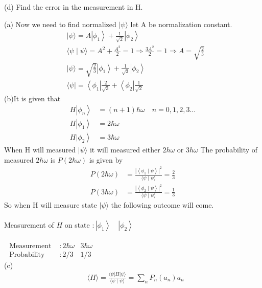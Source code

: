 \begin{enumerate}
	(d) Find the error in the measurement in $\mathrm{H}$.
\begin{answer}
(a)	Now we need to find normalized $|\psi\rangle$ let A be normalization constant.\\
	\begin{align*}
	&|\psi\rangle=A\left|\phi_{1}\right\rangle+\frac{1}{\sqrt{2}}\left|\phi_{2}\right\rangle \\
	&\langle\psi \mid \psi\rangle=A^{2}+\frac{A^{2}}{2}=1 \Rightarrow \frac{3 A^{2}}{2}=1 \Rightarrow A=\sqrt{\frac{2}{3}}\\
		&|\psi\rangle=\sqrt{\frac{2}{3}}\left|\phi_{1}\right\rangle+\frac{1}{\sqrt{3}}\left|\phi_{2}\right\rangle \\
		&\langle\psi|=\left\langle\phi_{1}\right| \frac{2}{\sqrt{3}}+\left\langle\phi_{2}\right| \frac{1}{\sqrt{2}}
	\end{align*}
	(b)It is given that
	\begin{align*}
	H\left|\phi_{n}\right\rangle&=(n+1) \hbar \omega \quad n=0,1,2,3 \ldots\\
		H\left|\phi_{1}\right\rangle&=2 \hbar \omega\\
			\left.H| \phi_{2}\right\rangle&=3 \hbar \omega	
	\end{align*}
	When $\mathrm{H}$ will measured $|\psi\rangle$ it will measured either $2 h \omega$ or $3 h \omega$ The probability of measured $2 \hbar \omega$ is $P(2 \hbar \omega)$ is given by
	\begin{align*}
	P(2 \hbar \omega)&=\frac{\left|\left\langle\phi_{1} \mid \psi\right\rangle\right|^{2}}{\langle\psi \mid \psi\rangle}=\frac{2}{3}\\
	P(3 \hbar \omega)&=\frac{\left|\left\langle\phi_{2} \mid \psi\right\rangle\right|^{2}}{\langle\psi \mid \psi\rangle}=\frac{1}{3}
	\end{align*}
	So when $\mathrm{H}$ will measure state $|\psi\rangle$ the following outcome will come.\\\\
	Measurement of $H$ on state $:\left|\phi_{1}\right\rangle \quad\left|\phi_{2}\right\rangle$\\\\
	$\begin{array}{lll}
		\text { Measurement } & : 2 \hbar \omega & 3 \hbar \omega \\
		\text { Probability } & : 2 / 3 & 1 / 3
	\end{array}$\\
	(c)\begin{align*}
		&\langle H\rangle=\frac{\langle\psi|H| \psi\rangle}{\langle\psi \mid \psi\rangle}=\sum_{n} P_{n}\left(a_{n}\right) a_{n} \\

\end{align*}
\end{answer}
\end{enumerate}
